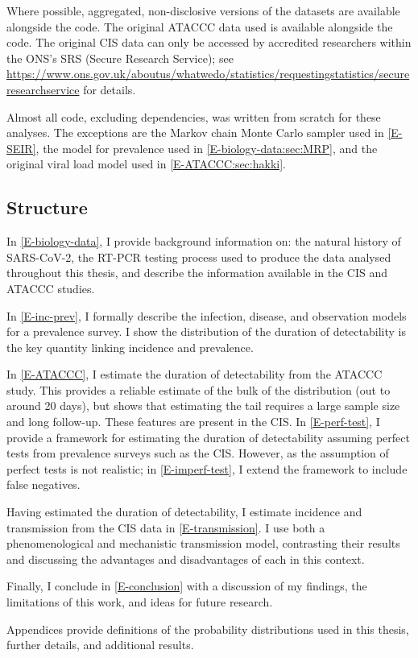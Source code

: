 \documentclass[thesis.tex]{subfiles}
\begin{document}
Where possible, aggregated, non-disclosive versions of the datasets are available alongside the code.
The original ATACCC data used is available alongside the code.
The original CIS data can only be accessed by accredited researchers within the ONS's SRS (Secure Research Service); see \url{https://www.ons.gov.uk/aboutus/whatwedo/statistics/requestingstatistics/secureresearchservice} for details.

Almost all code, excluding dependencies, was written from scratch for these analyses.
The exceptions are the Markov chain Monte Carlo sampler used in \cref{E-SEIR}, the model for prevalence used in \cref{E-biology-data:sec:MRP}, and the original viral load model used in \cref{E-ATACCC:sec:hakki}.

\subsection{Structure}

In \cref{E-biology-data}, I provide background information on: the natural history of SARS-CoV-2, the RT-PCR testing process used to produce the data analysed throughout this thesis, and describe the information available in the CIS and ATACCC studies.

In \cref{E-inc-prev}, I formally describe the infection, disease, and observation models for a prevalence survey.
I show the distribution of the duration of detectability is the key quantity linking incidence and prevalence.

In \cref{E-ATACCC}, I estimate the duration of detectability from the ATACCC study.
This provides a reliable estimate of the bulk of the distribution (out to around 20 days),  but shows that estimating the tail requires a large sample size and long follow-up. 
These features are present in the CIS.
In \cref{E-perf-test}, I provide a framework for estimating the duration of detectability assuming perfect tests from prevalence surveys such as the CIS.
However, as the assumption of perfect tests is not realistic; in \cref{E-imperf-test}, I extend the framework to include false negatives.

Having estimated the duration of detectability, I estimate incidence and transmission from the CIS data in \cref{E-transmission}.
I use both a phenomenological and mechanistic transmission model, contrasting their results and discussing the advantages and disadvantages of each in this context.

Finally, I conclude in \cref{E-conclusion} with a discussion of my findings, the limitations of this work, and ideas for future research.

Appendices provide definitions of the probability distributions used in this thesis, further details, and additional results.


\ifSubfilesClassLoaded{
  \appendix
%   
  \listoftodos
}{}
\end{document}
